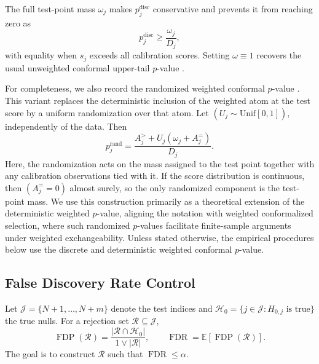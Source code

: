 The full test-point mass $\omega_j$ makes $p_j^{\mathrm{disc}}$ conservative and prevents it from reaching zero as
\begin{equation}
p_j^{\mathrm{disc}}\ge \frac{\omega_j}{D_j},
\end{equation}
with equality when $s_j$ exceeds all calibration scores. Setting $\omega\equiv 1$ recovers the usual unweighted conformal upper-tail $p$-value \cite{Bates2023}.

For completeness, we also record the randomized weighted conformal $p$-value \cite{Jin2025}. This variant replaces the deterministic inclusion of the weighted atom at the test score by a uniform randomization over that atom. Let $(U_j\sim\mathrm{Unif}[0,1])$, independently of the data. Then \begin{equation}\label{eq:weighted_ecdf_rand} p_j^{\mathrm{rand}} =
\frac{A_j^{>}+U_j(\omega_j+A_j^{=})}{D_j}.
\end{equation}
Here, the randomization acts on the mass assigned to the test point together with any calibration observations tied with it. If the score distribution is continuous, then $(A_j^{=}=0)$ almost surely, so the only randomized component is the test-point mass. We use this construction primarily as a theoretical extension of the deterministic weighted $p$-value, aligning the notation with weighted conformalized selection, where such randomized $p$-values facilitate finite-sample arguments under weighted exchangeability. Unless stated otherwise, the empirical procedures below use the discrete and deterministic weighted conformal $p$-value.

\subsection{False Discovery Rate Control}

Let
\(\mathcal{J}=\{N+1,\ldots,N+m\}\) denote the test indices and
\(\mathcal{H}_0=\{j\in\mathcal{J}:H_{0,j}\text{ is true}\}\) the true nulls.
For a rejection set \(\mathcal{R}\subseteq\mathcal{J}\),
\[
    \operatorname{FDP}(\mathcal{R})
    =
    \frac{|\mathcal{R}\cap\mathcal{H}_0|}{1\vee|\mathcal{R}|},
    \qquad
    \operatorname{FDR}
    =
    \mathbb{E}\!\left[\operatorname{FDP}(\mathcal{R})\right].
\]
The goal is to construct \(\mathcal{R}\) such that
\(\operatorname{FDR}\le\alpha\).

